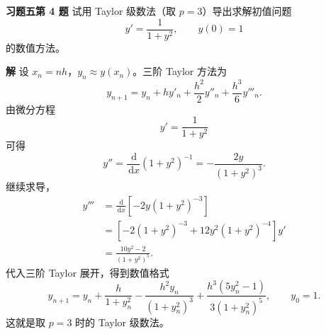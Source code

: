 \documentclass[UTF8,a4paper,11pt]{ctexart}
\newcommand{\dd}{\,\mathrm{d}}
\begin{document}
\bigskip\bigskip

\noindent\textbf{习题五\quad 第 4 题}\quad
试用 Taylor 级数法（取 $p=3$）导出求解初值问题
\[
  y'=\frac{1}{1+y^2},\qquad y(0)=1
\]
的数值方法。

\medskip
\noindent\textbf{解}\quad
设 $x_n=nh$，$y_n\approx y(x_n)$。三阶 Taylor 方法为
\[
  y_{n+1}
  =
  y_n+h y'_n+\frac{h^2}{2}y''_n+\frac{h^3}{6}y'''_n.
\]
由微分方程
\[
  y'=\frac{1}{1+y^2}
\]
可得
\[
  y''
  =
  \frac{\dd}{\dd x}\left(1+y^2\right)^{-1}
  =
  -\frac{2y}{(1+y^2)^3}.
\]
继续求导，
\[
\begin{aligned}
  y'''
  &=
  \frac{\dd}{\dd x}
  \left[-2y(1+y^2)^{-3}\right]  \\
  &=
  \left[-2(1+y^2)^{-3}+12y^2(1+y^2)^{-4}\right]y'  \\
  &=
  \frac{10y^2-2}{(1+y^2)^5}.
\end{aligned}
\]
代入三阶 Taylor 展开，得到数值格式
\[
  \boxed{
  y_{n+1}
  =
  y_n
  +\frac{h}{1+y_n^2}
  -\frac{h^2y_n}{(1+y_n^2)^3}
  +\frac{h^3(5y_n^2-1)}{3(1+y_n^2)^5},
  \qquad y_0=1.}
\]
这就是取 $p=3$ 时的 Taylor 级数法。
\end{document}
